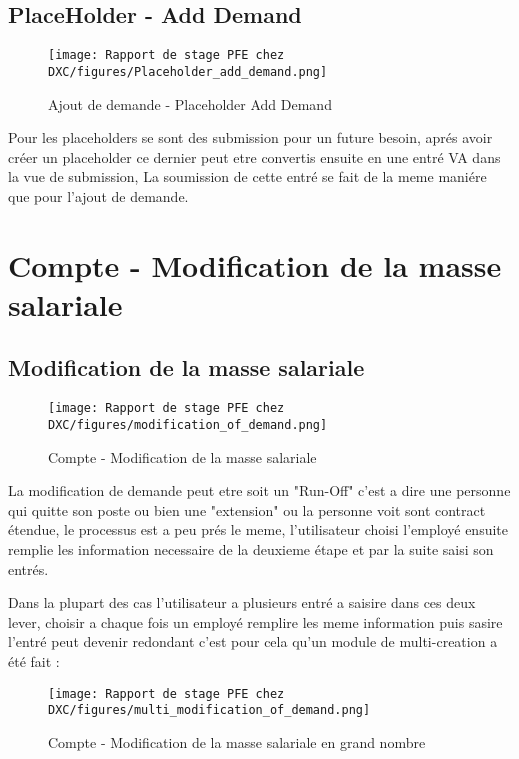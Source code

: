 \subsection{PlaceHolder - Add Demand}

\begin{figure}[H]
    \centering
    \texttt{[image: Rapport de stage PFE chez DXC/figures/Placeholder\_add\_demand.png]}
    \caption{Ajout de demande - Placeholder Add Demand}
\end{figure}

Pour les placeholders se sont des submission pour un future besoin, aprés avoir créer un placeholder ce dernier peut etre convertis ensuite en une entré VA dans la vue de submission, La soumission de cette entré se fait de la meme maniére que pour l'ajout de demande. 


\section{Compte - Modification de la masse salariale}

\subsection{Modification de la masse salariale}
\begin{figure}[H]
    \centering
    \texttt{[image: Rapport de stage PFE chez DXC/figures/modification\_of\_demand.png]}
    \caption{Compte - Modification de la masse salariale}
\end{figure}

La modification de demande peut etre soit un "Run-Off" c'est a dire une personne qui quitte son poste ou bien une "extension" ou la personne voit sont contract étendue, le processus est a peu prés le meme, l'utilisateur choisi l'employé ensuite remplie les information necessaire de la deuxieme étape et par la suite saisi son entrés.

\newpage

Dans la plupart des cas l'utilisateur a plusieurs entré a saisire dans ces deux lever, choisir a chaque fois un employé remplire les meme information puis sasire l'entré peut devenir redondant c'est pour cela qu'un module de multi-creation a été fait :

\begin{figure}[H]
    \centering
    \texttt{[image: Rapport de stage PFE chez DXC/figures/multi\_modification\_of\_demand.png]}
    \caption{Compte - Modification de la masse salariale en grand nombre}
\end{figure}

